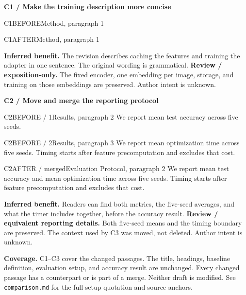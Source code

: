 \documentclass[11pt]{article}
\begin{document}
{\large\bfseries\color{rcInk}C1 / Make the training description more concise}
\begin{rcPassage}{C1}{BEFORE}{Method, paragraph 1}
\end{rcPassage}
\begin{rcPassage}{C1}{AFTER}{Method, paragraph 1}
\end{rcPassage}
{\small\textbf{Inferred benefit.} The revision describes caching the features and training the adapter
in one sentence. The original wording is grammatical.
\textbf{Review / exposition-only.} The fixed encoder, one embedding per image,
storage, and training on those embeddings are preserved. Author intent is unknown.}

\vspace{8pt}
{\large\bfseries\color{rcInk}C2 / Move and merge the reporting protocol}
\begin{rcPassage}{C2}{BEFORE / 1}{Results, paragraph 2}
We report mean test accuracy across five seeds.
\end{rcPassage}
\begin{rcPassage}{C2}{BEFORE / 2}{Results, paragraph 3}
We report mean optimization time across five seeds. Timing starts after
feature precomputation and excludes that cost.
\end{rcPassage}
\begin{rcPassage}{C2}{AFTER / merged}{Evaluation Protocol, paragraph 2}
We report mean test accuracy and mean optimization time across five seeds.
Timing starts after feature precomputation and excludes that cost.
\end{rcPassage}
{\small\textbf{Inferred benefit.} Readers can find both metrics, the five-seed averages, and what the timer
includes together, before the accuracy result. \textbf{Review / equivalent reporting details.}
Both five-seed means and the timing boundary are preserved. The context used by
C3 was moved, not deleted. Author intent is unknown.}

\vfill
{\footnotesize\color{rcMuted}\textbf{Coverage.} C1--C3 cover the changed passages.
The title, headings, baseline definition, evaluation setup, and accuracy result
are unchanged. Every changed passage has a counterpart or is part of a
merge. Neither draft is modified.
See \texttt{comparison.md} for the full setup quotation and source anchors.}
\end{document}
